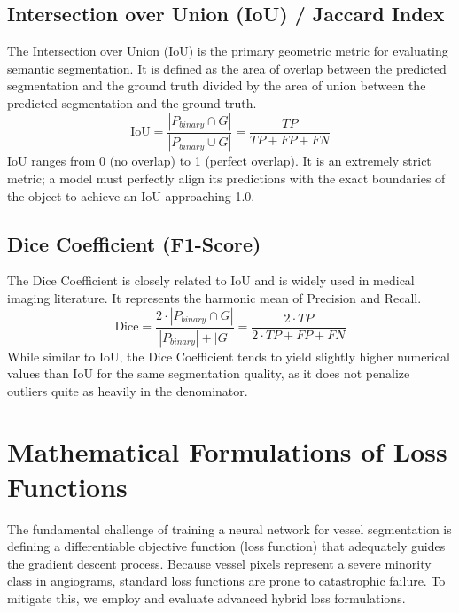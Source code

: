 \subsection{Intersection over Union (IoU) / Jaccard Index}
The Intersection over Union (IoU) is the primary geometric metric for evaluating semantic segmentation. It is defined as the area of overlap between the predicted segmentation and the ground truth divided by the area of union between the predicted segmentation and the ground truth.
\begin{equation}
    \text{IoU} = \frac{|P_{binary} \cap G|}{|P_{binary} \cup G|} = \frac{TP}{TP + FP + FN}
\end{equation}
IoU ranges from 0 (no overlap) to 1 (perfect overlap). It is an extremely strict metric; a model must perfectly align its predictions with the exact boundaries of the object to achieve an IoU approaching 1.0.

\subsection{Dice Coefficient (F1-Score)}
The Dice Coefficient is closely related to IoU and is widely used in medical imaging literature. It represents the harmonic mean of Precision and Recall.
\begin{equation}
    \text{Dice} = \frac{2 \cdot |P_{binary} \cap G|}{|P_{binary}| + |G|} = \frac{2 \cdot TP}{2 \cdot TP + FP + FN}
\end{equation}
While similar to IoU, the Dice Coefficient tends to yield slightly higher numerical values than IoU for the same segmentation quality, as it does not penalize outliers quite as heavily in the denominator. 

\section{Mathematical Formulations of Loss Functions}
The fundamental challenge of training a neural network for vessel segmentation is defining a differentiable objective function (loss function) that adequately guides the gradient descent process. Because vessel pixels represent a severe minority class in angiograms, standard loss functions are prone to catastrophic failure. To mitigate this, we employ and evaluate advanced hybrid loss formulations.

